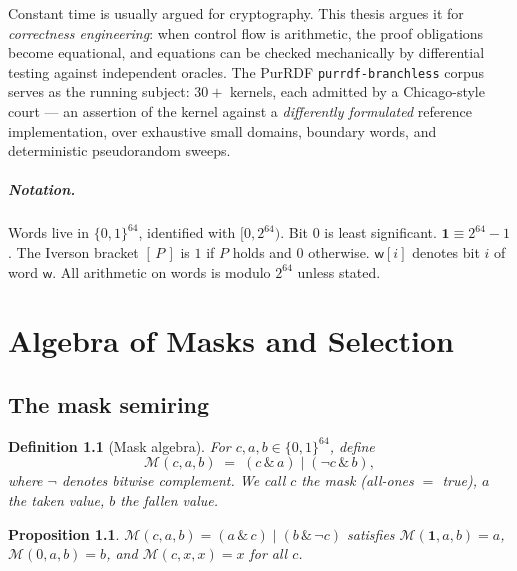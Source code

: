 \documentclass[11pt,a4paper]{report}
\newtheorem{proposition}[theorem]{Proposition}
\newtheorem{definition}[theorem]{Definition}
\newcommand{\mask}{\mathcal{M}}
\newcommand{\word}{\mathsf{w}}
\newcommand{\ones}{\mathbf{1}}
\newcommand{\sel}[1]{\left[\,#1\,\right]}
\begin{document}
Constant time is usually argued for cryptography. This thesis argues it
for \emph{correctness engineering}: when control flow is arithmetic,
the proof obligations become equational, and equations can be checked
mechanically by differential testing against independent oracles. The
PurRDF \texttt{purrdf-branchless} corpus serves as the running subject:
$30{+}$ kernels, each admitted by a Chicago-style court --- an assertion
of the kernel against a \emph{differently formulated} reference
implementation, over exhaustive small domains, boundary words, and
deterministic pseudorandom sweeps.

\paragraph{Notation.} Words live in $\{0,1\}^{64}$, identified with
$[0,2^{64})$. Bit $0$ is least significant. $\ones \equiv
2^{64}-1$. The Iverson bracket $\sel{P}$ is $1$ if $P$ holds and $0$
otherwise. $\word[i]$ denotes bit $i$ of word $\word$. All arithmetic on
words is modulo $2^{64}$ unless stated.

\chapter{Algebra of Masks and Selection}

\section{The mask semiring}

\begin{definition}[Mask algebra]
For $c, a, b \in \{0,1\}^{64}$, define
\begin{equation}
\label{eq:mask-sel}
\mask(c,a,b) \;=\; (c \,\&\, a) \;|\; (\lnot c \,\&\, b),
\end{equation}
where $\lnot$ denotes bitwise complement. We call $c$ the
\emph{mask} (all-ones $=$ true), $a$ the taken value, $b$ the fallen
value.
\end{definition}

\begin{proposition}\label{prop:mask-sel-eq}
$\mask(c,a,b) = (a \,\&\, c) \;|\; (b \,\&\, \lnot c)$ satisfies
$\mask(\ones, a, b) = a$, $\mask(0, a, b) = b$, and
$\mask(c, x, x) = x$ for all $c$.
\end{proposition}
\end{document}

